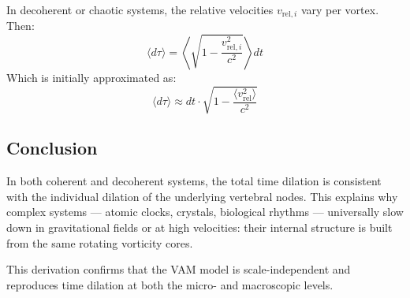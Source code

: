 In decoherent or chaotic systems, the relative velocities \( v_{\text{rel}, i} \) vary per vortex. Then:
\begin{equation}
\langle d\tau \rangle = \left\langle \sqrt{1 - \frac{v_{\text{rel}, i}^2}{c^2}} \right\rangle dt
\end{equation}
Which is initially approximated as:
\begin{equation}
\langle d\tau \rangle \approx dt \cdot \sqrt{1 - \frac{\langle v_{\text{rel}}^2 \rangle}{c^2}} \label{eq:average_dil}
\end{equation}

\subsection*{Conclusion}

In both coherent and decoherent systems, the total time dilation is consistent with the individual dilation of the underlying vertebral nodes. This explains why complex systems — atomic clocks, crystals, biological rhythms — universally slow down in gravitational fields or at high velocities: their internal structure is built from the same rotating vorticity cores.

\vspace{1em}
\noindent
This derivation confirms that the VAM model is scale-independent and reproduces time dilation at both the micro- and macroscopic levels.